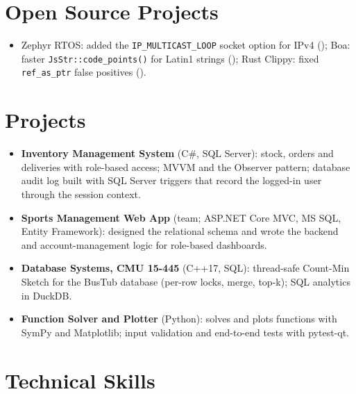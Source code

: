\documentclass[10pt]{article}
\begin{document}
\section*{Open Source Projects}
\begin{itemize}
  \item Zephyr RTOS: added the \texttt{IP\_MULTICAST\_LOOP} socket option for IPv4 (); Boa: faster \texttt{JsStr::code\_points()} for Latin1 strings (); Rust Clippy: fixed \texttt{ref\_as\_ptr} false positives ().
\end{itemize}

\section*{Projects}
\begin{itemize}
  \item \textbf{Inventory Management System} (C\#, SQL Server): stock, orders and deliveries with role-based access; MVVM and the Observer pattern; database audit log built with SQL Server triggers that record the logged-in user through the session context. 
  \item \textbf{Sports Management Web App} (team; ASP.NET Core MVC, MS SQL, Entity Framework): designed the relational schema and wrote the backend and account-management logic for role-based dashboards. 
  \item \textbf{Database Systems, CMU 15-445} (C++17, SQL): thread-safe Count-Min Sketch for the BusTub database (per-row locks, merge, top-k); SQL analytics in DuckDB. 
  \item \textbf{Function Solver and Plotter} (Python): solves and plots functions with SymPy and Matplotlib; input validation and end-to-end tests with pytest-qt. 
\end{itemize}

\section*{Technical Skills}
\end{document}
